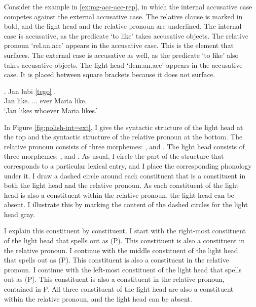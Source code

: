 Consider the example in \ref{ex:mg-acc-acc-rep}, in which the internal accusative case competes against the external accusative case. The relative clause is marked in bold, and the light head and the relative pronoun are underlined.
The internal case is accusative, as the predicate  `to like' takes accusative objects. The relative pronoun  `\ac{rel}.\ac{an}.\ac{acc}' appears in the accusative case. This is the element that surfaces.
The external case is accusative as well, as the predicate  `to like' also takes accusative objects. The light head  `\ac{dem}.\ac{an}.\ac{acc}' appears in the accusative case. It is placed between square brackets because it does not surface.

\exg. Jan lubi \underline{[tego]} \underline{}   .\\
 Jan like.\scsub{[acc]} ... ever Maria like.\scsub{[acc]}\\
 `Jan likes whoever Maria likes.' \label{ex:polish-acc-acc-rep}

In Figure \ref{fig:polish-int=ext}, I give the syntactic structure of the light head at the top and the syntactic structure of the relative pronoun at the bottom.
The relative pronoun consists of three morphemes: ,  and .
The light head consists of three morphemes: ,  and .
As usual, I circle the part of the structure that corresponds to a particular lexical entry, and I place the corresponding phonology under it.
I draw a dashed circle around each constituent that is a constituent in both the light head and the relative pronoun.
As each constituent of the light head is also a constituent within the relative pronoun, the light head can be absent. I illustrate this by marking the content of the dashed circles for the light head gray.

I explain this constituent by constituent.
I start with the right-most constituent of the light head that spells out as  (P). This constituent is also a constituent in the relative pronoun.
I continue with the middle constituent of the light head that spells out as  (P). This constituent is also a constituent in the relative pronoun.
I continue with the left-most constituent of the light head that spells out as  (P). This constituent is also a constituent in the relative pronoun, contained in P.
All three constituent of the light head are also a constituent within the relative pronoun, and the light head can be absent.


